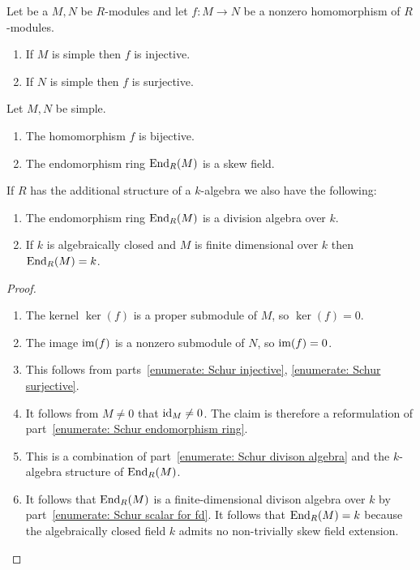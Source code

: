 \begin{proposition}
  \label{proposition: Schurs lemma for modules}
  Let be a $M, N$ be $R$-modules and let $f \colon M \to N$ be a nonzero homomorphism of $R$-modules.
  \begin{enumerate}
    \item
      \label{enumerate: Schur injective}
      If $M$ is simple then $f$ is injective.
    \item
      \label{enumerate: Schur surjective}
      If $N$ is simple then $f$ is surjective.
  \end{enumerate}
  Let $M, N$ be simple.
  \begin{enumerate}[resume]
    \item
      \label{enumerate: Schur bijective}
      The homomorphism $f$ is bijective.
    \item
      \label{enumerate: Schur endomorphism ring}
      The endomorphism ring $\operatorname{End}_R(M)$ is a skew field.
  \end{enumerate}
  If $R$ has the additional structure of a $k$-algebra we also have the following:
  \begin{enumerate}[resume]
    \item
      \label{enumerate: Schur divison algebra}
      The endomorphism ring $\operatorname{End}_R(M)$ is a division algebra over $k$.
    \item
      \label{enumerate: Schur scalar for fd}
      If $k$ is algebraically closed and $M$ is finite dimensional over $k$ then $\operatorname{End}_R(M) = k$.
  \end{enumerate}
\end{proposition}


\begin{proof}
  \leavevmode
  \begin{enumerate}
    \item
      The kernel $\ker(f)$ is a proper submodule of $M$, so $\ker(f) = 0$.
    \item
      The image $\operatorname{im}(f)$ is a nonzero submodule of $N$, so $\operatorname{im}(f) = 0$.
    \item
      This follows from parts~\ref*{enumerate: Schur injective}, \ref*{enumerate: Schur surjective}.
    \item
      It follows from $M \neq 0$ that $\operatorname{id}_M \neq 0$.
      The claim is therefore a reformulation of part~\ref*{enumerate: Schur endomorphism ring}.
    \item
      This is a combination of part~\ref*{enumerate: Schur divison algebra} and the $k$-algebra structure of $\operatorname{End}_R(M)$.
    \item
      It follows that $\operatorname{End}_R(M)$ is a finite-dimensional divison algebra over $k$ by part~\ref*{enumerate: Schur scalar for fd}.
      It follows that $\operatorname{End}_R(M) = k$ because the algebraically closed field $k$ admits no non-trivially skew field extension.
    \qedhere
  \end{enumerate}
\end{proof}



